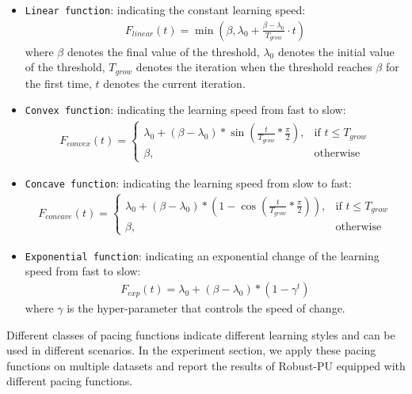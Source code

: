 \documentclass[sigconf]{acmart}
\newcommand{\ourmethod}{Robust-PU\xspace}
\begin{document}
\begin{itemize}

    \item \texttt{Linear function}: indicating the constant learning speed:
    \begin{align}
        F_{linear} (t) = \min(\beta, \lambda_0+\frac{\beta-\lambda_0}{T_{grow}}\cdot t)\label{sf:linear}
    \end{align}
    where $\beta$ denotes the final value of the threshold, $\lambda_0$ denotes the initial value of the threshold, $T_{grow}$ denotes the iteration when the threshold reaches $\beta$ for the first time, $t$ denotes the current iteration.
    
    \item \texttt{Convex function}: indicating the learning speed from fast to slow:
    \begin{align}
        F_{convex}(t) = 
            \begin{cases}
                \lambda_0+(\beta-\lambda_0)*\sin(\frac{t}{T_{grow}}*\frac{\pi}{2}), &\text{if $t\le T_{grow}$}\\
                \beta, &\text{otherwise}\label{sf:convex}
            \end{cases}
    \end{align}
    
    
    \item \texttt{Concave function}: indicating the learning speed from slow to fast:
    \begin{align}
        F_{concave}(t) =  
            \begin{cases}
                \lambda_0+(\beta - \lambda_0) * (1 - \cos(\frac{t}{T_{grow}} * \frac{\pi}{2})), &\text{if $t\le T_{grow}$}\\
                \beta, &\text{otherwise}\label{sf:concave}
            \end{cases}
    \end{align}

    \item \texttt{Exponential function}: indicating an exponential change of the learning speed from fast to slow:
      \begin{align}
            F_{exp}(t) = \lambda_0 + (\beta - \lambda_0) * (1 - \gamma^t)\label{sf:exp}
        \end{align}
        where $\gamma$ is the hyper-parameter that controls the speed of change.
    
\end{itemize}
Different classes of pacing functions indicate different learning styles and can be used in different scenarios. In the experiment section, we apply these pacing functions on multiple datasets and report the results of \ourmethod equipped with different pacing functions.
\end{document}
